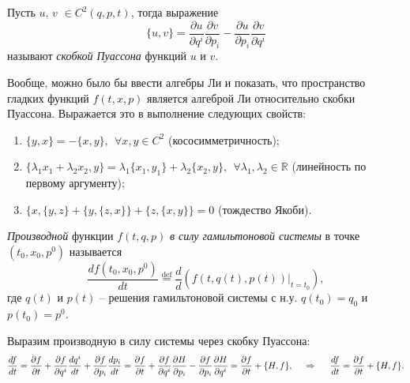 \begin{to_def} 
    Пусть $u$, $v$ $\in C^2(q, p, t)$, тогда выражение
    \begin{equation*}
        \{u, v\}  
        =
        \frac{\partial u}{\partial q^i} \frac{\partial v}{\partial p_i} -
        \frac{\partial u}{\partial p_i} \frac{\partial v}{\partial q^i}
    \end{equation*}  
    называют \textit{скобкой Пуассона} функций $u$ и $v$.
\end{to_def}

Вообще, можно было бы ввести алгебры Ли и показать, что пространство гладких функций $f(t, x, p)$ является алгеброй Ли относительно скобки Пуассона. Выражается это в выполнение следующих свойств:
\begin{enumerate}
    \item $\{y, x\} = - \{x, y\}, \ \ \forall x, y \in C^2$ (кососимметричность);
    \item $\{\lambda_1 x_1 + \lambda_2 x_2, y\} = \lambda_1 \{x_1, y_1\} + \lambda_2 \{x_2, y\},
    \ \ \forall \lambda_1, \lambda_2 \in \mathbb{R}
    $ (линейность по первому аргументу);
    \item $\{x, \{y, z\} + \{y, \{z, x\}\} + \{z, \{x, y\}\} = 0$ (тождество Якоби).
\end{enumerate}

\begin{to_def} 
    \textit{Производной} функции $f(t, q, p)$ \textit{в силу гамильтоновой системы} в точке $(t_0, x_0, p^0)$ называется
    \begin{equation*}
         \frac{d f(t_0, x_0, p^0)}{d t} \overset{\mathrm{def}}{=} \frac{d }{d } 
         \left(
            f(t, q(t), p(t)) \big|_{t=t_0}
         \right),
     \end{equation*} 
     где $q(t)$ и $p(t)$ -- решения гамильтоновой системы с н.у. $q(t_0) = q_0$ и $p(t_0) = p^0$. 
\end{to_def}

Выразим производную в силу системы через скобку Пуассона:
\begin{equation*}
    \frac{d f}{d t} 
    =
     \frac{\partial f}{\partial t} + \frac{\partial f}{\partial q^i} \frac{d q^i}{d t} + \frac{\partial f}{\partial p_i} \frac{d p_i}{d t} 
     =
      \frac{\partial f}{\partial t} + \frac{\partial f}{\partial q^i} \frac{\partial H}{\partial p_i} - \frac{\partial f}{\partial p_i} \frac{\partial H}{\partial q^i} = \frac{\partial f}{\partial t} + \{H, f\},
      \hspace{0.5cm} \Rightarrow \hspace{0.5cm} 
      \frac{d f}{d t} = \frac{\partial f}{\partial t} + \{H, f\}.
\end{equation*}

